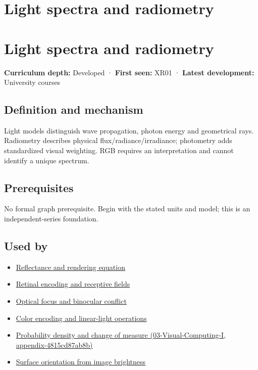 \hypertarget{appendix-215c2570199b}{}
\section*{Light spectra and radiometry}
\section{Light spectra and radiometry}\label{appendix-215c2570199b-light-spectra-and-radiometry}

\textbf{Curriculum depth:} Developed · \textbf{First seen:} XR01 · \textbf{Latest development:} University courses

\subsection{Definition and mechanism}\label{appendix-215c2570199b-definition-and-mechanism}

Light models distinguish wave propagation, photon energy and geometrical rays. Radiometry describes physical flux/radiance/irradiance; photometry adds standardized visual weighting. RGB requires an interpretation and cannot identify a unique spectrum.

\subsection{Prerequisites}\label{appendix-215c2570199b-prerequisites}

No formal graph prerequisite. Begin with the stated units and model; this is an independent-series foundation.

\subsection{Used by}\label{appendix-215c2570199b-used-by}

\begin{itemize}
\tightlist
\item
  \hyperref[appendix-96da0b153b77]{Reflectance and rendering equation}
\item
  \hyperref[appendix-7281c15ac44a]{Retinal encoding and receptive fields}
\item
  \hyperref[appendix-f90cee1be7a4]{Optical focus and binocular conflict}
\item
  \hyperref[appendix-a9f83ad40792]{Color encoding and linear-light operations}
\item
  \href{../03-Visual-Computing-I/main.pdf\#nameddest=appendix-4815cd87ab8b}{Probability density and change of measure (03-Visual-Computing-I, appendix-4815cd87ab8b)}
\item
  \hyperref[appendix-89b2d5b7c9e1]{Surface orientation from image brightness}
\end{itemize}

